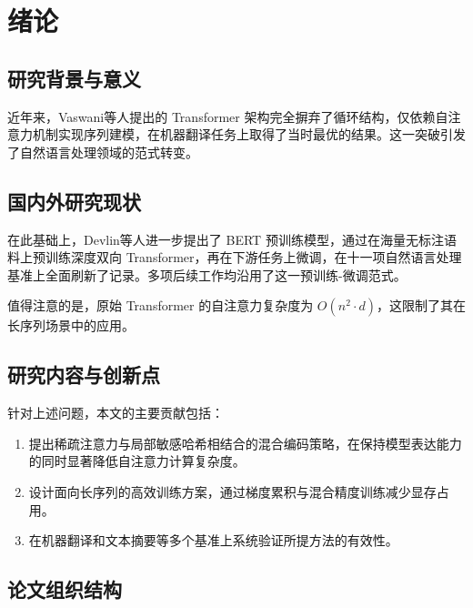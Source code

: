 \chapter{绪论}

\section{研究背景与意义}

\zhlipsum[1]

近年来，Vaswani等人\cite{vaswani2017attention}提出的 Transformer 架构完全摒弃了循环结构，仅依赖自注意力机制实现序列建模，在机器翻译任务上取得了当时最优的结果。这一突破引发了自然语言处理领域的范式转变\cite{devlin2019bert}。

\zhlipsum[2]

\section{国内外研究现状}

\zhlipsum[3]

在此基础上，Devlin等人\cite{devlin2019bert}进一步提出了 BERT 预训练模型，通过在海量无标注语料上预训练深度双向 Transformer，再在下游任务上微调，在十一项自然语言处理基准上全面刷新了记录。多项后续工作\cite{vaswani2017attention,devlin2019bert}均沿用了这一预训练-微调范式。

\zhlipsum[4]

值得注意的是，原始 Transformer 的自注意力复杂度为 $O(n^2 \cdot d)$\cite{vaswani2017attention}，这限制了其在长序列场景中的应用。

\section{研究内容与创新点}

\zhlipsum[6]

针对上述问题，本文的主要贡献包括：

\begin{enumerate}
  \item 提出稀疏注意力与局部敏感哈希相结合的混合编码策略，在保持模型表达能力的同时显著降低自注意力计算复杂度。
  \item 设计面向长序列的高效训练方案，通过梯度累积与混合精度训练减少显存占用。
  \item 在机器翻译和文本摘要等多个基准上系统验证所提方法的有效性。
\end{enumerate}

\section{论文组织结构}

\zhlipsum[11]
